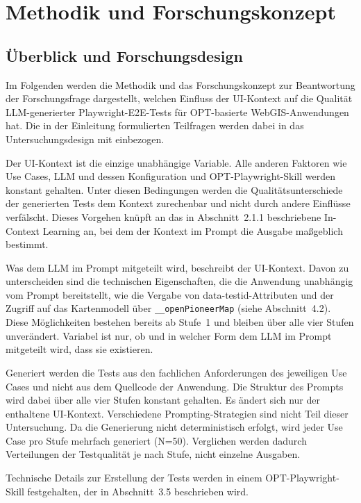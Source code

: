 \newpage
\section{Methodik und Forschungskonzept}

\subsection{Überblick und Forschungsdesign}

Im Folgenden werden die Methodik und das Forschungskonzept zur Beantwortung der Forschungsfrage dargestellt, welchen Einfluss der \ac{UI}-Kontext auf die Qualität \ac{LLM}-generierter Playwright-\ac{E2E}-Tests für \ac{OPT}-basierte WebGIS-Anwendungen hat. Die in der Einleitung formulierten Teilfragen werden dabei in das Untersuchungsdesign mit einbezogen.

Der \ac{UI}-Kontext ist die einzige unabhängige Variable. Alle anderen Faktoren wie Use Cases, \ac{LLM} und dessen Konfiguration und OPT-Playwright-Skill werden konstant gehalten. Unter diesen Bedingungen werden die Qualitätsunterschiede der generierten Tests dem Kontext zurechenbar und nicht durch andere Einflüsse verfälscht. Dieses Vorgehen knüpft an das in Abschnitt~2.1.1 beschriebene In-Context Learning an, bei dem der Kontext im Prompt die Ausgabe maßgeblich bestimmt.

Was dem \ac{LLM} im Prompt mitgeteilt wird, beschreibt der \ac{UI}-Kontext. Davon zu unterscheiden sind die technischen Eigenschaften, die die Anwendung unabhängig vom Prompt bereitstellt, wie die Vergabe von data-testid-Attributen und der Zugriff auf das Kartenmodell über \texttt{\_\_openPioneerMap} (siehe Abschnitt~4.2). Diese Möglichkeiten bestehen bereits ab Stufe~1 und bleiben über alle vier Stufen unverändert. Variabel ist nur, ob und in welcher Form dem \ac{LLM} im Prompt mitgeteilt wird, dass sie existieren.

Generiert werden die Tests aus den fachlichen Anforderungen des jeweiligen Use Cases und nicht aus dem Quellcode der Anwendung. Die Struktur des Prompts wird dabei über alle vier Stufen konstant gehalten. Es ändert sich nur der enthaltene \ac{UI}-Kontext. Verschiedene Prompting-Strategien sind nicht Teil dieser Untersuchung. Da die Generierung nicht deterministisch erfolgt, wird jeder Use Case pro Stufe mehrfach generiert (N=50). Verglichen werden dadurch Verteilungen der Testqualität je nach Stufe, nicht einzelne Ausgaben.

Technische Details zur Erstellung der Tests werden in einem \ac{OPT}-Playwright-Skill festgehalten, der in Abschnitt~3.5 beschrieben wird.

